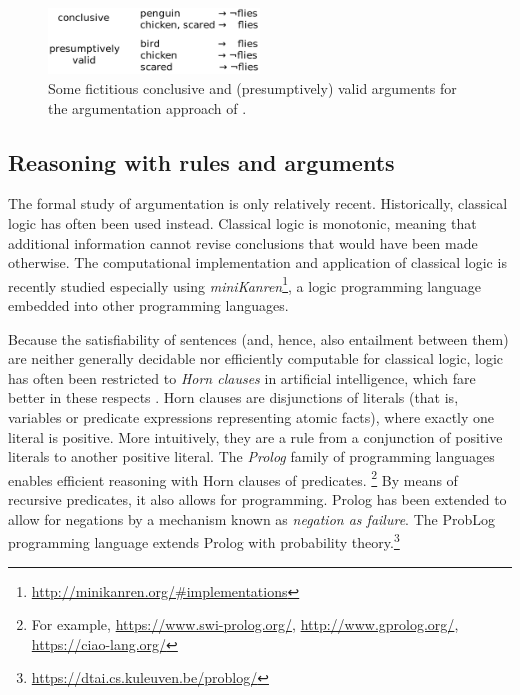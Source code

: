 \begin{figure}[htb]
        \centering
        \includegraphics[width=0.5\textwidth]{images/arguments.png}
        \caption{Some fictitious conclusive and (presumptively) valid arguments for the argumentation approach of \cite{verheijProofProbabilities2017}.}
        \label{fig:arguments}
\end{figure}


\subsection{Reasoning with rules and arguments}

The formal study of argumentation is only relatively recent. Historically, classical logic has often been used instead. Classical logic is monotonic, meaning that additional information cannot revise conclusions that would have been made otherwise. The computational implementation and application of classical logic is recently studied especially using \textit{miniKanren}\footnote{\url{http://minikanren.org/\#implementations}}, a logic programming language embedded into other programming languages.

Because the satisfiability of sentences (and, hence, also entailment between them) are neither generally decidable nor efficiently computable for classical logic, logic has often been restricted to \textit{Horn clauses} in artificial intelligence, which fare better in these respects \citep[ch.~7.5.3]{russellArtificialIntelligenceModern2010}. Horn clauses are disjunctions of literals (that is, variables or predicate expressions representing atomic facts), where exactly one literal is positive. More intuitively, they are a rule from a conjunction of positive literals to another positive literal. The \textit{Prolog} family of programming languages enables efficient reasoning with Horn clauses of predicates. \footnote{For example, \url{https://www.swi-prolog.org/}, \url{http://www.gprolog.org/}, \url{https://ciao-lang.org/}} By means of recursive predicates, it also allows for programming. Prolog has been extended to allow for negations by a mechanism known as \textit{negation as failure}. The ProbLog programming language extends Prolog with probability theory.\footnote{\url{https://dtai.cs.kuleuven.be/problog/}} 

